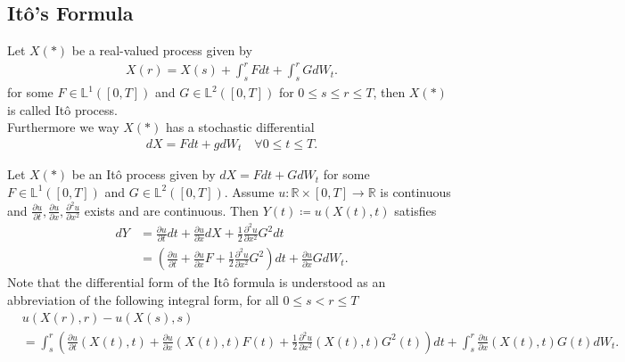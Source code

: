 \subsection{It\^o's Formula}
\begin{definition}[It\^o Process]
 Let $X(*)$ be a real-valued process given by 
 \begin{align*}
  X(r) = X(s) + \int_s^{r} F dt + \int_s^{r} GdW_t  
 .\end{align*}
 for some $F \in  \mathbb{L}^1([0,T])$ and $G \in  \mathbb{L}^2([0,T])$ for $0\le s\le r\le T$, then $X(*)$ is called It\^o process.\\[1ex]
 Furthermore we way $X(*)$ has a stochastic differential 
 \begin{align*}
  dX =  Fdt + gdW_t \quad \forall  0\le t\le T
 .\end{align*}
\end{definition}
\begin{theorem}[It\^o's Formula]
  Let $X(*)$  be an It\^o process given by $dX = F dt + GdW_t$ for some $F \in  \mathbb{L}^{1}([0,T]) $ and $G \in  \mathbb{L}^2([0,T])$. Assume 
  $u : \mathbb{R} \times  [0,T] \to \mathbb{R}$ is continuous and $\frac{\partial u}{\partial t} ,\frac{\partial u}{\partial x} ,\frac{\partial ^2 u}{\partial x^2} $ exists and 
  are continuous. Then $Y(t) \coloneqq  u(X(t),t)$ satisfies 
  \begin{align*}
    dY &= \frac{\partial u}{\partial t} dt + \frac{\partial u}{\partial x} dX + \frac{1}{2 }\frac{\partial ^2 u}{\partial x^2} G^2 dt\\
       &=(\frac{\partial u}{\partial t} +\frac{\partial u}{\partial x} F + \frac{1}{2} \frac{\partial ^2 u}{\partial x^2} G^2 )dt + \frac{\partial u}{\partial x} G dW_t
  .\end{align*}
  Note that the differential form of the It\^o formula is understood as an abbreviation of the following integral form, for all $0\le s < r \le T$
  \begin{align*}
    &u(X(r),r) - u(X(s),s) \\
    &= \int_s^{r}(\frac{\partial u}{\partial t}(X(t),t)+\frac{\partial u}{\partial x}(X(t),t)F(t) + \frac{1}{2}\frac{\partial ^2 u}{\partial x^2}(X(t),t)G^2(t) )dt + \int_s^{r} \frac{\partial u}{\partial x}(X(t),t) G(t)dW_t
  .\end{align*}
  \end{theorem}
